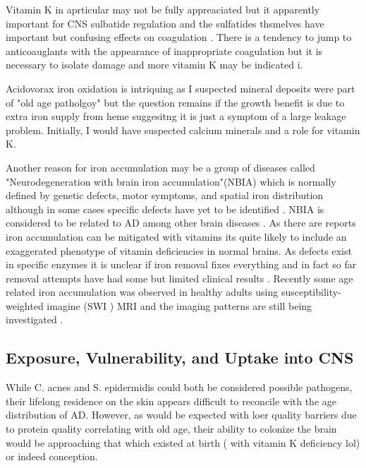 \documentclass[aps,secnumarabic,balancelastpage,amsmath,amssymb,nofootinbib]{revtex4}
\begin{document}
Vitamin K in aprticular may not be fully appreaciated but
it apparently important for CNS sulbatide regulation
\cite{PMID8914944}
\cite{PMC6110503}
and the sulfatides thsmelves have important but confusing effects
on coagulation \cite{Kyogashima2001}.
There is a tendency to jump to anticoauglants with the
appearance of inappropriate coagulation but it is necessary
to isolate damage and more vitamin K may be indicated
i\cite{marchywka-MJM-2022-015-0.20c}.


Acidovorax iron oxidation  is intriquing as I suspected mineral deposits were part
of "old age patholgoy" but the question remains if the growth
benefit is due to extra iron supply from heme suggesitng
it is just a symptom of a large leakage problem. Initially, 
I would have suspected calcium minerals and a role for vitamin K.

Another reason for iron accumulation may be a group of
diseases called "Neurodegeneration with brain iron accumulation"(NBIA)
which is normally defined by genetic defects, motor symptoms, and spatial
iron distribution although in some cases specific
defects have yet to be identified
\cite{KURIAN_MCNEILL_LIN_Childhood_disorders_neurodegeneration_2011}
. 
NBIA is considered to be related to AD among other brain diseases
\cite{WANG2019109068}.
As there are reports iron accumulation can be mitigated with vitamins 
\cite{PMC9364590} \cite{PMC10091671}
its quite likely to include  an exaggerated
phenotype of vitamin deficiencies in normal brains. 
As defects exist in specific enzymes 
it is unclear if iron removal fixes everything and in fact
so far removal attempts have had some but limited clinical results
\cite{10.3389/fneur.2021.629414}.
Recently some age related iron accumulation
was observed in healthy adults using susceptibility-weighted imagine
(SWI )  MRI \cite{vanderWeijden_vanLaar_Lambrechts_Cortical_pencil_lining_2019}
and the imaging patterns are still being investigated 
\cite{10.3389/fneur.2020.01024}.

 
\subsection{Exposure, Vulnerability, and Uptake into CNS }


While C. acnes and S. epidermidis could both
be considered possible pathogens, their lifelong
residence on the skin appears difficult to
reconcile with the age distribution of AD.
However, as would be expected with loer quality
barriers due to protein quality correlating
with old age, their ability to colonize
the brain would be approaching that
which existed at birth ( with vitamin K deficiency lol)
 or indeed conception.
\end{document}
